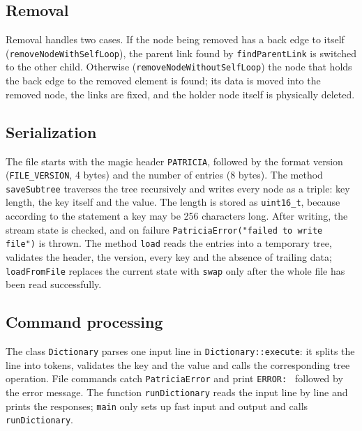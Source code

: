 \subsection{Removal}

Removal handles two cases. If the node being removed has a back edge to itself
(\texttt{removeNodeWithSelfLoop}), the parent link found by \texttt{findParentLink} is switched to
the other child. Otherwise (\texttt{removeNodeWithoutSelfLoop}) the node that holds the back edge
to the removed element is found; its data is moved into the removed node, the links are fixed, and
the holder node itself is physically deleted.

\subsection{Serialization}

The file starts with the magic header \texttt{PATRICIA}, followed by the format version
(\texttt{FILE\_VERSION}, 4 bytes) and the number of entries (8 bytes). The method
\texttt{saveSubtree} traverses the tree recursively and writes every node as a triple: key length,
the key itself and the value. The length is stored as \texttt{uint16\_t}, because according to the
statement a key may be 256 characters long. After writing, the stream state is checked, and on
failure \texttt{PatriciaError("failed to write file")} is thrown. The method \texttt{load} reads the
entries into a temporary tree, validates the header, the version, every key and the absence of
trailing data; \texttt{loadFromFile} replaces the current state with \texttt{swap} only after the
whole file has been read successfully.

\subsection{Command processing}

The class \texttt{Dictionary} parses one input line in \texttt{Dictionary::execute}: it splits the
line into tokens, validates the key and the value and calls the corresponding tree operation. File
commands catch \texttt{PatriciaError} and print \texttt{ERROR: } followed by the error message.
The function \texttt{runDictionary} reads the input line by line and prints the responses;
\texttt{main} only sets up fast input and output and calls \texttt{runDictionary}.



